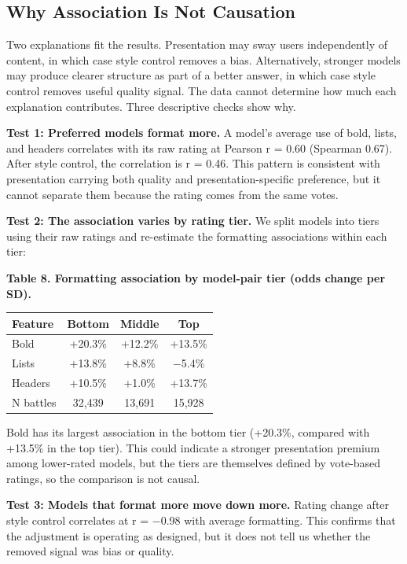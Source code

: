\documentclass[
]{article}
\newcounter{none} %
\begin{document}
\subsection{Why Association Is Not
Causation}\label{why-association-is-not-causation}

Two explanations fit the results. Presentation may sway users
independently of content, in which case style control removes a bias.
Alternatively, stronger models may produce clearer structure as part of
a better answer, in which case style control removes useful quality
signal. The data cannot determine how much each explanation contributes.
Three descriptive checks show why.

\textbf{Test 1: Preferred models format more.} A model's average use of
bold, lists, and headers correlates with its raw rating at Pearson r =
0.60 (Spearman 0.67). After style control, the correlation is r = 0.46.
This pattern is consistent with presentation carrying both quality and
presentation-specific preference, but it cannot separate them because
the rating comes from the same votes.

\textbf{Test 2: The association varies by rating tier.} We split models
into tiers using their raw ratings and re-estimate the formatting
associations within each tier:

\textbf{Table 8. Formatting association by model-pair tier (odds change
per SD).}

{\def\LTcaptype{none}
\begin{longtable}[]{@{}lccc@{}}
\toprule\noalign{}
Feature & Bottom & Middle & Top \\
\midrule\noalign{}
\endhead
\bottomrule\noalign{}
\endlastfoot
Bold & +20.3\% & +12.2\% & +13.5\% \\
Lists & +13.8\% & +8.8\% & −5.4\% \\
Headers & +10.5\% & +1.0\% & +13.7\% \\
N battles & 32,439 & 13,691 & 15,928 \\
\end{longtable}
}

Bold has its largest association in the bottom tier (+20.3\%, compared
with +13.5\% in the top tier). This could indicate a stronger
presentation premium among lower-rated models, but the tiers are
themselves defined by vote-based ratings, so the comparison is not
causal.

\textbf{Test 3: Models that format more move down more.} Rating change
after style control correlates at r = −0.98 with average formatting.
This confirms that the adjustment is operating as designed, but it does
not tell us whether the removed signal was bias or quality.
\end{document}
